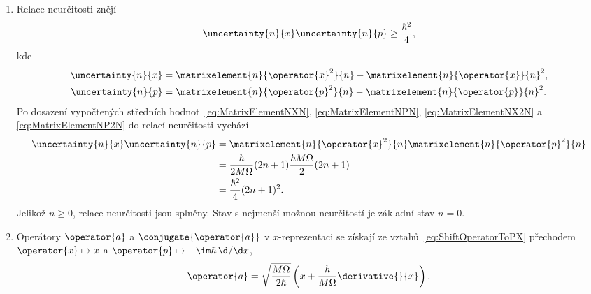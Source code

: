 \begin{solution}
\begin{enumerate}
	\item
		Relace neurčitosti znějí
		\begin{equation}
			\uncertainty{n}{x}\uncertainty{n}{p}\geq\frac{\hbar^{2}}{4},
		\end{equation}
		kde
		\begin{subequations}
			\begin{align}
				\uncertainty{n}{x}
					&=\matrixelement{n}{\operator{x}^{2}}{n}-\matrixelement{n}{\operator{x}}{n}^{2},\\
					\uncertainty{n}{p}
					&=\matrixelement{n}{\operator{p}^{2}}{n}-\matrixelement{n}{\operator{p}}{n}^{2}.
			\end{align}
		\end{subequations}
		Po dosazení vypočtených středních hodnot~\eqref{eq:MatrixElementNXN}, \eqref{eq:MatrixElementNPN}, \eqref{eq:MatrixElementNX2N} a \eqref{eq:MatrixElementNP2N} do relací neurčitosti vychází
		\begin{align}
			\uncertainty{n}{x}\uncertainty{n}{p}
				&=\matrixelement{n}{\operator{x}^{2}}{n}\matrixelement{n}{\operator{p}^{2}}{n}\nonumber\\
				&=\frac{\hbar}{2M\Omega}(2n+1)\frac{\hbar M\Omega}{2}(2n+1)\nonumber\\
				&=\frac{\hbar^{2}}{4}(2n+1)^{2}.
		\end{align}
		Jelikož $n\geq0$, relace neurčitosti jsou splněny.
        Stav s nejmenší možnou neurčitostí je základní stav $n=0$.
        
    \item 
        Operátory $\operator{a}$ a $\conjugate{\operator{a}}$ v $x$-reprezentaci se získají ze vztahů~\eqref{eq:ShiftOperatorToPX} přechodem $\operator{x}\mapsto x$ a $\operator{p}\mapsto-\im\hbar\,\d/\d x$,
        \begin{equation}\label{eq:ShiftOperatorXRepresentation}
            \operator{a}
                =\sqrt{\frac{M\Omega}{2\hbar}}\left(x+\frac{\hbar}{M\Omega}\derivative{}{x}\right).
        \end{equation}


\end{enumerate}
\end{solution}
